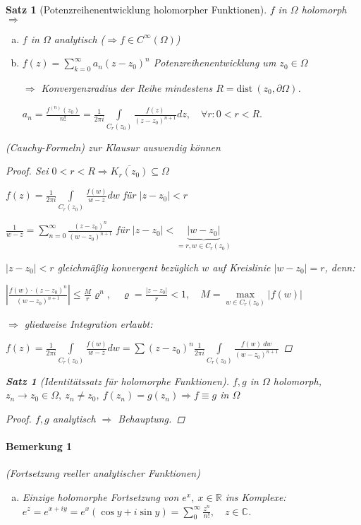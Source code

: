 \documentclass[ngerman,halfparskip]{scrartcl}
\newtheorem{satz}{Satz}[section]
\newtheorem*{satz*}{Satz}
\theoremstyle{definition}
\def\R{\mathbb R}
\def\C{\mathbb C}
\begin{document}
\begin{satz}[Potenzreihenentwicklung holomorpher Funktionen]
$f$ in $\Omega$ holomorph $\Rightarrow$
\begin{enumerate}[a)]
\item $f$ in $\Omega$ analytisch ($\Rightarrow f\in C^\infty(\Omega)$)
\item $f(z)=\sum\limits_{k=0}^\infty a_n (z-z_0)^n$ Potenzreihenentwicklung um $z_0 \in \Omega$

$\Rightarrow$ Konvergenzradius der Reihe mindestens $R=\text{dist} ~ (z_0,\partial\Omega)$.

$a_n=\frac {f^{(n)}(z_0)}{n!}=\frac 1{2\pi i} \int\limits _{C_r(z_0)} \frac{f(z)}{(z-z_0)^{n+1}}dz, \quad \forall r: 0<r<R.$

\end{enumerate}
(Cauchy-Formeln)  zur Klausur auswendig können

\begin{proof}
Sei $0<r<R \Rightarrow \overline{K_r(z_0)}\subseteq \Omega$

$f(z)=\frac 1{2\pi i} \int\limits _{C_r(z_0)}\frac {f(w)}{w-z}dw$ für $|z-z_0|<r$

$\frac 1 {w-z}=\sum\limits_{n=0}^\infty \frac{(z-z_0)^n}{(w-z_0)^{n+1}}$ für $|z-z_0|<\underbrace{|w-z_0|}_{=r, w\in C_r(z_0)}$

$|z-z_0|<r$ gleichmäßig konvergent bezüglich $w$ auf Kreislinie $|w-z_0|=r$, denn: 

$\left| \frac {f(w) \cdot (z-z_0)^n} {(w-z_0)^{n+1}} \right |\leq \frac Mr\varrho^n, \quad \varrho =\frac {|z-z_0|}r<1, \quad M=\max\limits_{w\in C_r(z_0)} |f(w)| $

$\Rightarrow$ gliedweise Integration erlaubt:

$f(z)=\frac 1 {2\pi i }\int\limits _{C_r(z_0)}\frac {f(w)}{w-z}dw=\sum (z-z_0)^n\frac 1 {2\pi i}\int\limits _{C_r(z_0)}\frac {f(w)~dw}{(w-z_0)^{n+1}}$ 

\end{proof}

\begin{satz*}[Identitätssatz für holomorphe Funktionen]
$f,g$ in $\Omega$ holomorph, $z_n\rightarrow z_0 \in\Omega,~ z_n\neq z_0, ~f(z_n)=g(z_n) \Rightarrow f\equiv g$ in $\Omega$
\begin{proof}
$f,g$ analytisch $\Rightarrow$ Behauptung.
\end{proof}

\end{satz*}

\paragraph{Bemerkung 1}(Fortsetzung reeller analytischer Funktionen) 
\begin{enumerate}[a)]
\item Einzige holomorphe Fortsetzung von $e^x, ~x\in\R$ ins Komplexe: $e^z=e^{x+iy}=e^x(\cos y +i \sin y)=\sum\limits _0^\infty\frac{z^n}{n!}, \quad z\in\C$.


\end{enumerate}
\end{satz}
\end{document}
